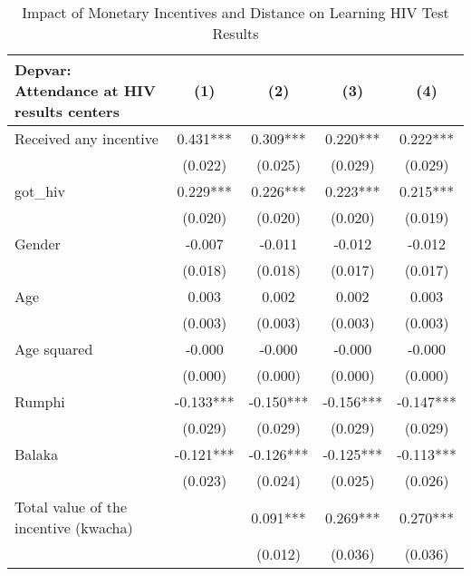 \begin{table}[htbp]\centering
\small
\caption{Impact of Monetary Incentives and Distance on Learning HIV Test Results}
\begin{center}
\begin{threeparttable}
\begin{tabular}{l*{4}{c}}
\toprule
\multicolumn{1}{l}{\textbf{Depvar:  Attendance at HIV results centers}}&
\multicolumn{1}{c}{\textbf{(1)}}&
\multicolumn{1}{c}{\textbf{(2)}}&
\multicolumn{1}{c}{\textbf{(3)}}&
\multicolumn{1}{c}{\textbf{(4)}}\\
\midrule
Received any incentive&       0.431***&       0.309***&       0.220***&       0.222***\\
                    &     (0.022)   &     (0.025)   &     (0.029)   &     (0.029)   \\
got\_hiv             &       0.229***&       0.226***&       0.223***&       0.215***\\
                    &     (0.020)   &     (0.020)   &     (0.020)   &     (0.019)   \\
Gender              &      -0.007   &      -0.011   &      -0.012   &      -0.012   \\
                    &     (0.018)   &     (0.018)   &     (0.017)   &     (0.017)   \\
Age                 &       0.003   &       0.002   &       0.002   &       0.003   \\
                    &     (0.003)   &     (0.003)   &     (0.003)   &     (0.003)   \\
Age squared         &      -0.000   &      -0.000   &      -0.000   &      -0.000   \\
                    &     (0.000)   &     (0.000)   &     (0.000)   &     (0.000)   \\
Rumphi              &      -0.133***&      -0.150***&      -0.156***&      -0.147***\\
                    &     (0.029)   &     (0.029)   &     (0.029)   &     (0.029)   \\
Balaka              &      -0.121***&      -0.126***&      -0.125***&      -0.113***\\
                    &     (0.023)   &     (0.024)   &     (0.025)   &     (0.026)   \\
Total value of the incentive (kwacha)&               &       0.091***&       0.269***&       0.270***\\
                    &               &     (0.012)   &     (0.036)   &     (0.036)   \\

\end{tabular}
\end{threeparttable}
\end{center}
\end{table}
